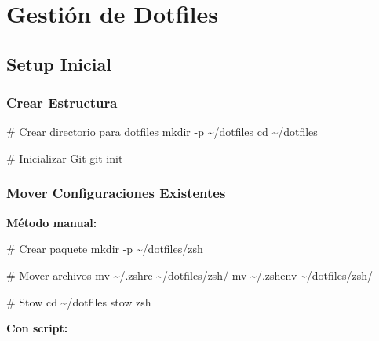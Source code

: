 \documentclass[
  doc,
  floatsintext,
  longtable,
  a4paper,
  nolmodern,
  notxfonts,
  notimes,
  12pt,
  colorlinks=true,linkcolor=blue,citecolor=blue,urlcolor=blue]{apa7}
\newenvironment{Shaded}{\begin{snugshade}}{\end{snugshade}}
\newcommand{\AttributeTok}[1]{\textcolor[rgb]{0.40,0.45,0.13}{#1}}
\newcommand{\BuiltInTok}[1]{\textcolor[rgb]{0.00,0.23,0.31}{#1}}
\newcommand{\CommentTok}[1]{\textcolor[rgb]{0.37,0.37,0.37}{#1}}
\newcommand{\ExtensionTok}[1]{\textcolor[rgb]{0.00,0.23,0.31}{#1}}
\newcommand{\FunctionTok}[1]{\textcolor[rgb]{0.28,0.35,0.67}{#1}}
\newcommand{\NormalTok}[1]{\textcolor[rgb]{0.00,0.23,0.31}{#1}}
\begin{document}
\section{Gestión de Dotfiles}\label{gestiuxf3n-de-dotfiles}

\subsection{Setup Inicial}\label{setup-inicial}

\subsubsection{Crear Estructura}\label{crear-estructura}

\begin{Shaded}
\begin{Highlighting}[]
\CommentTok{\# Crear directorio para dotfiles}
\FunctionTok{mkdir} \AttributeTok{{-}p}\NormalTok{ \textasciitilde{}/dotfiles}
\BuiltInTok{cd}\NormalTok{ \textasciitilde{}/dotfiles}

\CommentTok{\# Inicializar Git}
\FunctionTok{git}\NormalTok{ init}
\end{Highlighting}
\end{Shaded}

\subsubsection{Mover Configuraciones
Existentes}\label{mover-configuraciones-existentes}

\textbf{Método manual:}

\begin{Shaded}
\begin{Highlighting}[]
\CommentTok{\# Crear paquete}
\FunctionTok{mkdir} \AttributeTok{{-}p}\NormalTok{ \textasciitilde{}/dotfiles/zsh}

\CommentTok{\# Mover archivos}
\FunctionTok{mv}\NormalTok{ \textasciitilde{}/.zshrc \textasciitilde{}/dotfiles/zsh/}
\FunctionTok{mv}\NormalTok{ \textasciitilde{}/.zshenv \textasciitilde{}/dotfiles/zsh/}

\CommentTok{\# Stow}
\BuiltInTok{cd}\NormalTok{ \textasciitilde{}/dotfiles}
\ExtensionTok{stow}\NormalTok{ zsh}
\end{Highlighting}
\end{Shaded}

\textbf{Con script:}
\end{document}
